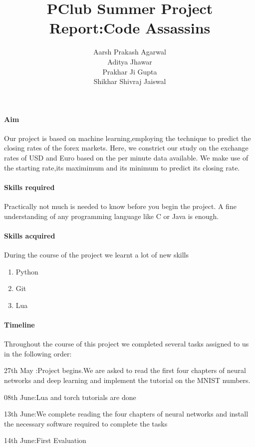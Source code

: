 \documentclass{article}
\title{PClub Summer Project Report:Code Assassins}
\author{Aarsh Prakash Agarwal\\Aditya Jhawar\\Prakhar Ji Gupta\\Shikhar Shivraj Jaiswal}
\begin{document}
 
\begin{titlepage}
\maketitle
\end{titlepage}

\paragraph{Aim}
Our project is based on machine learning,employing the technique to predict the closing rates of the forex markets. Here, we constrict our study on the exchange rates of USD and Euro based on the per minute data available. We make use of the starting rate,its maximimum and its minimum to predict its closing rate.

\paragraph{Skills required}
Practically not much is needed to know before you begin the project. A fine understanding of any programming language like C or Java is enough.

\paragraph{Skills acquired}
During the course of the project we learnt a lot of new skills
	\begin{enumerate}
		\item Python
		\item Git
		\item Lua
	\end{enumerate}
\newpage
\paragraph{Timeline}
Throughout the course of this project we completed several tasks assigned to us in the following order:

27th May :Project begins.We are asked to read the first four chapters of neural networks and deep learning and implement the tutorial on the MNIST numbers.

08th June:Lua and torch tutorials are done

13th June:We complete reading the four chapters of neural networks and install the necessary software required to complete the tasks

14th June:First Evaluation
\end{document}

